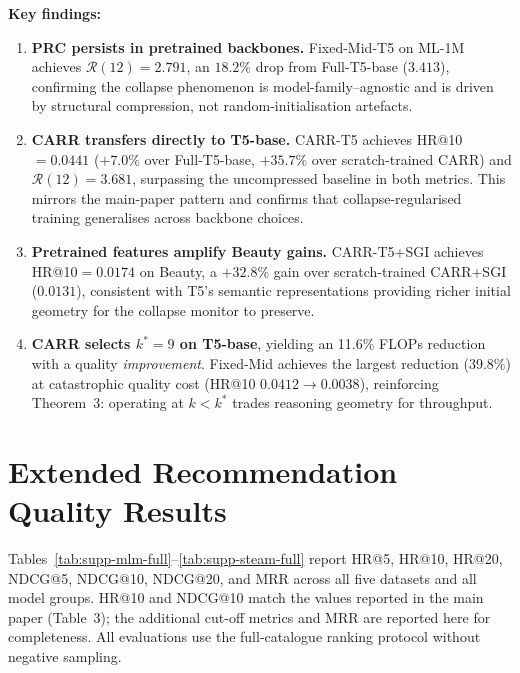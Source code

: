 \documentclass[letterpaper,10pt]{article}
\begin{document}
\noindent\textbf{Key findings:}
\begin{enumerate}
  \item \textbf{PRC persists in pretrained backbones.} Fixed-Mid-T5 on ML-1M achieves $\mathcal{R}(12){=}2.791$, an $18.2\%$ drop from Full-T5-base ($3.413$), confirming the collapse phenomenon is model-family--agnostic and is driven by structural compression, not random-initialisation artefacts.
  \item \textbf{CARR transfers directly to T5-base.} CARR-T5 achieves HR@10$=0.0441$ ($+7.0\%$ over Full-T5-base, $+35.7\%$ over scratch-trained CARR) and $\mathcal{R}(12){=}3.681$, surpassing the uncompressed baseline in both metrics. This mirrors the main-paper pattern and confirms that collapse-regularised training generalises across backbone choices.
  \item \textbf{Pretrained features amplify Beauty gains.} CARR-T5+SGI achieves HR@10$=0.0174$ on Beauty, a $+32.8\%$ gain over scratch-trained CARR+SGI ($0.0131$), consistent with T5's semantic representations providing richer initial geometry for the collapse monitor to preserve.
  \item \textbf{CARR selects $k^*=9$ on T5-base}, yielding an 11.6\% FLOPs reduction with a quality \emph{improvement}. Fixed-Mid achieves the largest reduction (39.8\%) at catastrophic quality cost (HR@10 $0.0412{\to}0.0038$), reinforcing Theorem~3: operating at $k < k^*$ trades reasoning geometry for throughput.
\end{enumerate}

\section{Extended Recommendation Quality Results}
\label{sec:supp-extended-metrics}

Tables~\ref{tab:supp-mlm-full}--\ref{tab:supp-steam-full} report HR@5, HR@10, HR@20, NDCG@5, NDCG@10, NDCG@20, and MRR across all five datasets and all model groups. HR@10 and NDCG@10 match the values reported in the main paper (Table~3); the additional cut-off metrics and MRR are reported here for completeness. All evaluations use the full-catalogue ranking protocol without negative sampling.
\end{document}
